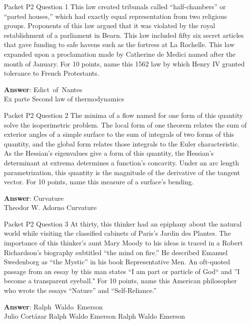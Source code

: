 \begin{frame}{Packet P2 Question 1}
This law created tribunals called “half-chambers”   or “parted houses,” which had exactly equal representation from two religious groups. Proponents of this law argued that it was violated by the royal establishment of a parliament in Bearn. This law included fifty six secret articles   that gave funding to safe havens such as the fortress at La Rochelle. This law   expanded upon a proclamation made by Catherine   de Medici named after the month of January. For 10 points, name this 1562 law by which Henry IV granted tolerance to French Protestants.  

\textbf{Answer}: Edict\ of\ Nantes\\
 Ex parte
 Second law of thermodynamics
\end{frame}

\begin{frame}{Packet P2 Question 2}
The minima of a flow named   for one form of this quantity solve the isoperimetric problem. The local form of one theorem relates the sum of exterior angles of a simple   surface to the sum of integrals of two forms of this quantity, and the global form relates those integrals to the Euler characteristic. As the Hessian's eigenvalues give a form of this quantity, the Hessian's determinant at extrema determines a function's concavity. Under an arc length parametrization, this quantity   is the magnitude of the derivative of the tangent vector.   For 10 points, name this measure of a surface's bending.  

\textbf{Answer}: Curvature\\
 Theodor W. Adorno
 Curvature
\end{frame}

\begin{frame}{Packet P2 Question 3}
At thirty, this thinker had an epiphany about the natural world while visiting the classified cabinets of Paris’s Jardin des Plantes. The importance   of this thinker’s aunt Mary Moody to his ideas is traced in a Robert Richardson’s biography subtitled “the mind on fire.” He described Emanuel Swedenborg as “the Mystic” in his book Representative Men. An oft-quoted passage from an essay by this man states “I am part or particle of God`` and ''I become a transparent eyeball." For 10   points, name this American philosopher who   wrote the essays “Nature” and “Self-Reliance.”    

\textbf{Answer}: Ralph\ Waldo\ Emerson\\
 Julio Cortázar
 Ralph Waldo Emerson
 Ralph Waldo Emerson
\end{frame}

